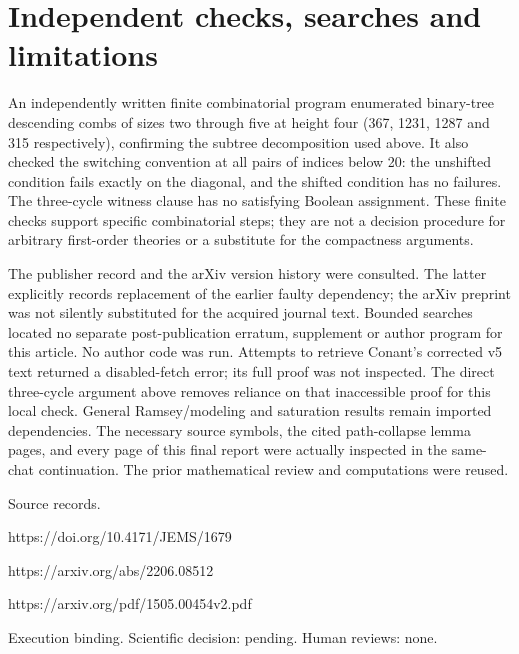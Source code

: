 \documentclass[10pt]{article}
\begin{document}
\section*{Independent checks, searches and limitations}
An independently written finite combinatorial program enumerated binary-tree descending combs of sizes two through five at height four (367, 1231, 1287 and 315 respectively), confirming the subtree decomposition used above. It also checked the switching convention at all pairs of indices below 20: the unshifted condition fails exactly on the diagonal, and the shifted condition has no failures. The three-cycle witness clause has no satisfying Boolean assignment. These finite checks support specific combinatorial steps; they are not a decision procedure for arbitrary first-order theories or a substitute for the compactness arguments.\par
The publisher record and the arXiv version history were consulted. The latter explicitly records replacement of the earlier faulty dependency; the arXiv preprint was not silently substituted for the acquired journal text. Bounded searches located no separate post-publication erratum, supplement or author program for this article. No author code was run. Attempts to retrieve Conant’s corrected v5 text returned a disabled-fetch error; its full proof was not inspected. The direct three-cycle argument above removes reliance on that inaccessible proof for this local check. General Ramsey/modeling and saturation results remain imported dependencies. The necessary source symbols, the cited path-collapse lemma pages, and every page of this final report were actually inspected in the same-chat continuation. The prior mathematical review and computations were reused.\par
Source records.\par
https://doi.org/10.4171/JEMS/1679\par
https://arxiv.org/abs/2206.08512\par
https://arxiv.org/pdf/1505.00454v2.pdf\par
Execution binding. Scientific decision: pending. Human reviews: none.\par
\end{document}
